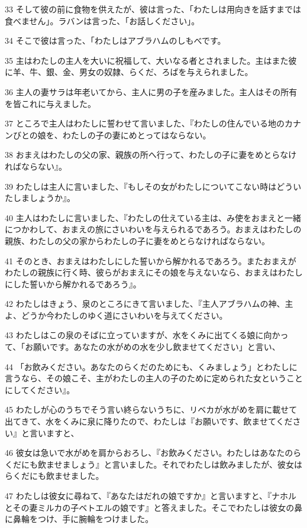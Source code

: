 \par 33 そして彼の前に食物を供えたが、彼は言った、「わたしは用向きを話すまでは食べません」。ラバンは言った、「お話しください」。
\par 34 そこで彼は言った、「わたしはアブラハムのしもべです。
\par 35 主はわたしの主人を大いに祝福して、大いなる者とされました。主はまた彼に羊、牛、銀、金、男女の奴隷、らくだ、ろばを与えられました。
\par 36 主人の妻サラは年老いてから、主人に男の子を産みました。主人はその所有を皆これに与えました。
\par 37 ところで主人はわたしに誓わせて言いました、『わたしの住んでいる地のカナンびとの娘を、わたしの子の妻にめとってはならない。
\par 38 おまえはわたしの父の家、親族の所へ行って、わたしの子に妻をめとらなければならない』。
\par 39 わたしは主人に言いました、『もしその女がわたしについてこない時はどういたしましょうか』。
\par 40 主人はわたしに言いました、『わたしの仕えている主は、み使をおまえと一緒につかわして、おまえの旅にさいわいを与えられるであろう。おまえはわたしの親族、わたしの父の家からわたしの子に妻をめとらなければならない。
\par 41 そのとき、おまえはわたしにした誓いから解かれるであろう。またおまえがわたしの親族に行く時、彼らがおまえにその娘を与えないなら、おまえはわたしにした誓いから解かれるであろう』。
\par 42 わたしはきょう、泉のところにきて言いました、『主人アブラハムの神、主よ、どうか今わたしのゆく道にさいわいを与えてください。
\par 43 わたしはこの泉のそばに立っていますが、水をくみに出てくる娘に向かって、「お願いです。あなたの水がめの水を少し飲ませてください」と言い、
\par 44 「お飲みください。あなたのらくだのためにも、くみましょう」とわたしに言うなら、その娘こそ、主がわたしの主人の子のために定められた女ということにしてください』。
\par 45 わたしが心のうちでそう言い終らないうちに、リベカが水がめを肩に載せて出てきて、水をくみに泉に降りたので、わたしは『お願いです、飲ませてください』と言いますと、
\par 46 彼女は急いで水がめを肩からおろし、『お飲みください。わたしはあなたのらくだにも飲ませましょう』と言いました。それでわたしは飲みましたが、彼女はらくだにも飲ませました。
\par 47 わたしは彼女に尋ねて、『あなたはだれの娘ですか』と言いますと、『ナホルとその妻ミルカの子ベトエルの娘です』と答えました。そこでわたしは彼女の鼻に鼻輪をつけ、手に腕輪をつけました。
